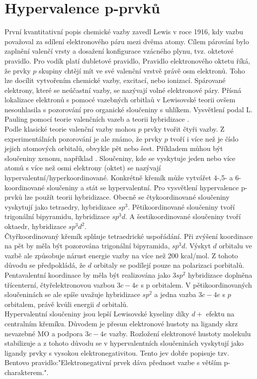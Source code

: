 \documentclass[
  digital, %
  table,   %
  lof,     %
  lot,     %
  oneside,
]{fithesis3}
\begin{document}
\section{Hypervalence p-prvků}
První kvantitativní popis chemické vazby zavedl Lewis v roce 1916, kdy vazbu považoval za sdílení elektronového páru mezi dvěma atomy. Cílem párování bylo zaplnění valenčí vrsty a dosažení konfigurace vzácného plynu, tvz. oktetové pravidlo. Pro vodík platí dubletové pravidlo, Pravidlo elektronového oktetu říká, že  prvky $p$ skupiny chtějí mít ve své valenční vrstvě právě osm elektronů. Toho lze docílit vytvořením chemické vazby, excitací, nebo ionizací. Spárované elektrony, které se neúčastní vazby, se nazývají volné elektronové páry. Přísná lokalizace elektronů s pomocé vazebných orbitlaů v Lewisovské teorii ovšem nesouhlasila s pozorování pro organické sloučeniny s uhlíkem. Vysvětlení podal L. Pauling pomocí teorie valenčních vazeb a teorii hybridizace \cite{Munzarova1996thesis}.\\
Podle klasické teorie valenční vazby mohou $p$ prvky tvořit čtyři vazby. Z experimentálních pozorování je ale známo, že prvky $p$  tvoří i více než je číslo jejich atomových orbitalů, obvykle pět nebo šest. Příkladem můhou být sloučeniny xenonu, například .
Sloučeniny, kde se vyskytuje jeden nebo více atomů s více než osmi elektrony (oktet) se nazývají hypervalentní/hyperkoordinované. Konkrétně křemík může vytvářet 4-,5- a 6- koordinované sloučeniny a stát se hypervalentní. Pro vysvětlení hypervalence p-prvků lze použít teorii hybridizace. Obecně se čtykoordinované sloučeniny vyskytují jako tetraedry, hybridizace $sp^3$. Pětikoordinované sloučeniny tvoří trigonální bipyramidu, hybridizace $sp^3d$. A šestikoordinované sloučeniny tvoří oktaedr, hybridizace $sp^3d^2$.\\
Čtyřkoordinovaný křemík splňuje tetraedrické uspořádání. Při zvýšení koordinace na pět by měla být pozorována trigonální bipyramida, $sp^3d$. Výskyt $d$ orbitalu ve vazbě ale způsobuje nárust energie vazby na více než 200 kcal/mol. Z tohoto důvodu se předpokládá, že $d$ orbitaly se podílejí pouze na polarizaci porbitalů. Pentavalentní koordinace by měla být realizována jako $3sp^2$ hybridizace doplněna třícenterní, čtyřelektronovou vazbou $3c-4e$ s p orbitalem. V pětikoordinovaných sloučeninách se ale spíše uvažuje hybridizace $sp^2$ a jedna vazba $3c-4e$ s $p$ orbitalem, právě kvůli energii $d$ orbitalů.\\
Hypervalentní sloučeniny jsou lepší Lewisovské kyseliny díky $d+$ efektu na centralním křemíku. Důvodem je přesun elektronové hustoty na ligandy skrz nevazebné MO a podpora $3c-4e$ vazby. Rozložení elektronové hustoty molekulu stabilizuje a z tohoto důvodu se v hypervalentních sloučeninách vyskytují jako ligandy prvky s vysokou elektronegativitou. Tento jev dobře popisuje tzv. Bentovo pravidlo:"Elektronegativní prvek dáva přednost vazbe s větším p-charakterem."\cite{hypervalentsiliconmacmillangroup2005}.\\
\end{document}
